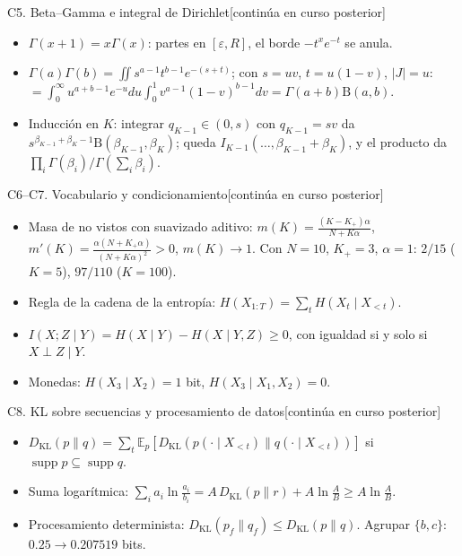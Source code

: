 \documentclass[aspectratio=169,10pt]{beamer}
\newcommand{\posterior}{\hfill{\scriptsize\color{vino}[continúa en curso posterior]}}
\begin{document}
\begin{frame}{C5. Beta--Gamma e integral de Dirichlet\posterior}
\small
\begin{itemize}
\item $\Gamma(x+1)=x\Gamma(x)$: partes en $[\varepsilon,R]$, el borde $-t^xe^{-t}$ se anula.
\item $\Gamma(a)\Gamma(b)=\iint s^{a-1}t^{b-1}e^{-(s+t)}$; con $s=uv$, $t=u(1-v)$, $|J|=u$:
$=\int_0^\infty u^{a+b-1}e^{-u}du\int_0^1v^{a-1}(1-v)^{b-1}dv=\Gamma(a+b)\mathrm B(a,b)$.
\item Inducción en $K$: integrar $q_{K-1}\in(0,s)$ con $q_{K-1}=sv$ da $s^{\beta_{K-1}+\beta_K-1}\mathrm B(\beta_{K-1},\beta_K)$;
queda $I_{K-1}(\ldots,\beta_{K-1}+\beta_K)$, y el producto da $\prod_i\Gamma(\beta_i)/\Gamma(\sum_i\beta_i)$.
\end{itemize}
\end{frame}

\begin{frame}{C6--C7. Vocabulario y condicionamiento\posterior}
\small
\begin{itemize}
\item Masa de no vistos con suavizado aditivo: $m(K)=\frac{(K-K_+)\alpha}{N+K\alpha}$,
$m'(K)=\frac{\alpha(N+K_+\alpha)}{(N+K\alpha)^2}>0$, $m(K)\to1$. Con $N=10$, $K_+=3$, $\alpha=1$: $2/15$ ($K=5$), $97/110$ ($K=100$).
\item Regla de la cadena de la entropía: $H(X_{1:T})=\sum_tH(X_t\mid X_{<t})$.
\item $I(X;Z\mid Y)=H(X\mid Y)-H(X\mid Y,Z)\ge0$, con igualdad si y solo si $X\perp Z\mid Y$.
\item Monedas: $H(X_3\mid X_2)=1$ bit, $H(X_3\mid X_1,X_2)=0$.
\end{itemize}
\end{frame}

\begin{frame}{C8. KL sobre secuencias y procesamiento de datos\posterior}
\small
\begin{itemize}
\item $D_{\mathrm{KL}}(p\|q)=\sum_t\mathbb E_p[D_{\mathrm{KL}}(p(\cdot\mid X_{<t})\|q(\cdot\mid X_{<t}))]$ si $\operatorname{supp}p\subseteq\operatorname{supp}q$.
\item Suma logarítmica: $\sum_ia_i\ln\frac{a_i}{b_i}=A\,D_{\mathrm{KL}}(p\|r)+A\ln\frac AB\ge A\ln\frac AB$.
\item Procesamiento determinista: $D_{\mathrm{KL}}(p_f\|q_f)\le D_{\mathrm{KL}}(p\|q)$.
Agrupar $\{b,c\}$: $0.25\to0.207519$ bits.
\end{itemize}
\end{frame}
\end{document}
